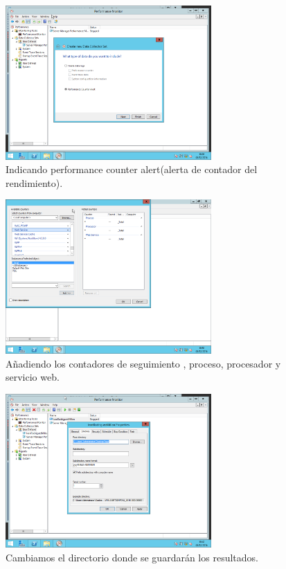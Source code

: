 \begin{figure}[H]
	\begin{center}
		\includegraphics[width=0.7\textwidth]{Imagenes/alerta_contador_rendimiento}
		\caption{Indicando performance counter alert(alerta de contador del rendimiento).} \label{fig:15}
	\end{center}
\end{figure}

\begin{figure}[H]
	\begin{center}
		\includegraphics[width=0.7\textwidth]{Imagenes/aniadimos_datos_seguimiento}
		\caption{Añadiendo los contadores de seguimiento , proceso, procesador y servicio web.} \label{fig:16}
	\end{center}
\end{figure}
 
\begin{figure}[H]
	\begin{center}
		\includegraphics[width=0.7\textwidth]{Imagenes/Cambiando_directorio_almacenamiento}
		\caption{Cambiamos el directorio donde se guardarán los resultados.} \label{fig:17}
	\end{center}
\end{figure}

